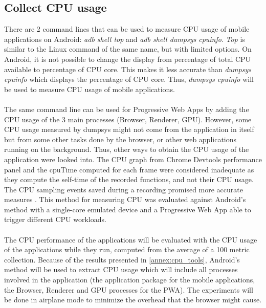 \documentclass{kththesis}
\begin{document}
\subsection{Collect CPU usage}

There are 2 command lines that can be used to measure CPU usage of mobile applications on Android: \textit{adb shell top} and \textit{adb shell dumpsys cpuinfo}. \textit{Top} is similar to the Linux command of the same name, but with limited options. On Android, it is not possible to change the display from percentage of total CPU available to percentage of CPU core. This makes it less accurate than \textit{dumpsys cpuinfo} which displays the percentage of CPU core. Thus, \textit{dumpsys cpuinfo} will be used to measure CPU usage of mobile applications. 

\paragraph{}
The same command line can be used for Progressive Web Apps by adding the CPU usage of the 3 main processes (Browser, Renderer, GPU). 
However, some CPU usage measured by dumpsys might not come from the application in itself but from some other tasks done by the browser, or other web applications running on the background. 
Thus, other ways to obtain the CPU usage of the application were looked into.
The CPU graph from Chrome Devtools performance panel and the cpuTime computed for each frame were considered inadequate as they compute the self-time of the recorded functions, and not their CPU usage. The CPU sampling events saved during a recording promised more accurate measures \cite{cpu_sampling}. This method for measuring CPU was evaluated against Android's method with a single-core emulated device and a Progressive Web App able to trigger different CPU workloads. \newline

\paragraph{}
The CPU performance of the applications will be evaluated with the CPU usage of the applications while they run, computed from the average of a 100 metric collection. Because of the results presented in \autoref{annex:cpu_tools}, Android's method will be used to extract CPU usage which will include all processes involved in the application (the application package for the mobile applications, the Browser, Renderer and GPU processes for the PWA). The experiments will be done in airplane mode to minimize the overhead that the browser might cause. 
\end{document}
